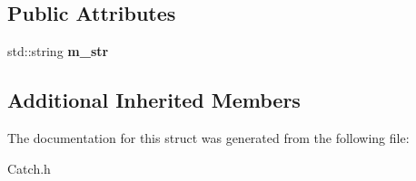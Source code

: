 \subsection*{Public Attributes}
\begin{DoxyCompactItemize}
\item 
\hypertarget{struct_catch_1_1_matchers_1_1_impl_1_1_std_string_1_1_equals_a41fc4413185f47d8b6d8da7a55078921}{std\-::string {\bfseries m\-\_\-str}}\label{struct_catch_1_1_matchers_1_1_impl_1_1_std_string_1_1_equals_a41fc4413185f47d8b6d8da7a55078921}

\end{DoxyCompactItemize}
\subsection*{Additional Inherited Members}


The documentation for this struct was generated from the following file\-:\begin{DoxyCompactItemize}
\item 
Catch.\-h\end{DoxyCompactItemize}
